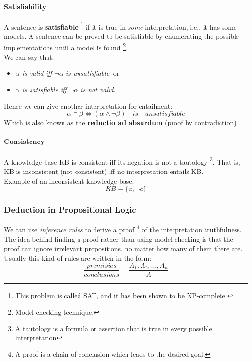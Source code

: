 \documentclass[10pt,a4paper]{article}
\begin{document}
\paragraph{Satisfiability}
\label{sec:satisfiability}
A sentence is \textbf{satisfiable} \footnote{This problem is called SAT, and it has been shown to be NP-complete.} if it is true in \textit{some} interpretation, i.e., it has some models. A sentence can be proved to be satisfiable by enumerating the possible implementations until a model is found \footnote{Model checking technique.}.\\
We can say that:
\begin{itemize}
\item \textit{$\alpha$ is valid iff $\neg \alpha$ is unsatisfiable}, or
\item \textit{$\alpha$ is satisfiable iff $\neg \alpha$ is not valid}.
\end{itemize}
Hence we can give another interpretation for entailment:
\[\alpha \models \beta \Longleftrightarrow (\alpha \wedge \neg \beta)\quad is \quad unsatisfiable\]
Which is also known as the \textbf{reductio ad absurdum} (proof by contradiction).


\paragraph{Consistency}
\label{sec:consistency}
A knowledge base KB is consistent iff its negation is not a tautology \footnote{A tautology  is a formula or assertion that is true in every possible interpretation}.
That is, KB is inconsistent (not consistent) iff no interpretation entails KB.\\
Example of an inconsistent knowledge base:
\[KB=\lbrace a, \neg a \rbrace\]


\subsubsection{Deduction in Propositional Logic}
\label{subsubsec:deduction}
We can use \textit{inference rules} to derive a proof \footnote{A proof is a chain of conclusion which leads to the desired goal.} of the interpretation truthfulness.
The idea behind finding a proof rather than using model checking is that the proof can ignore irrelevant propositions, no matter how many of them there are.\\
Usually this kind of rules are written in the form:
\[\frac{premisies}{conclusions}=\frac{A_1,A_2,...,A_n}{A}\]
\end{document}
